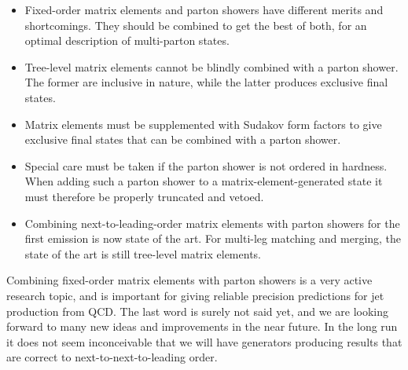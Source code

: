 \begin{itemize}
\item Fixed-order matrix elements and parton showers have different
  merits and shortcomings. They should be combined to get the best of
  both, for an optimal description of multi-parton states.
\item Tree-level matrix elements cannot be blindly combined with
  a parton shower. The former are inclusive in nature, while the latter
  produces exclusive final states.
\item Matrix elements must be supplemented with Sudakov form factors
  to give exclusive final states that can be combined with a parton
  shower.
\item Special care must be taken if the parton shower is not ordered
  in hardness. When adding such a parton shower to a
  matrix-element-generated state it must therefore be properly
  truncated and vetoed.
\item Combining next-to-leading-order matrix elements with parton
  showers for the first emission is now state of the art. For
  multi-leg matching and merging, the state of the art is still
  tree-level matrix elements.
\end{itemize}

Combining fixed-order matrix elements with parton showers is a very
active research topic, and is important for giving reliable precision
predictions for jet production from QCD. The last word is surely not
said yet, and we are looking forward to many new ideas and
improvements in the near future. In the long run it does not seem
inconceivable that we will have generators producing results that are
correct to next-to-next-to-leading order.


